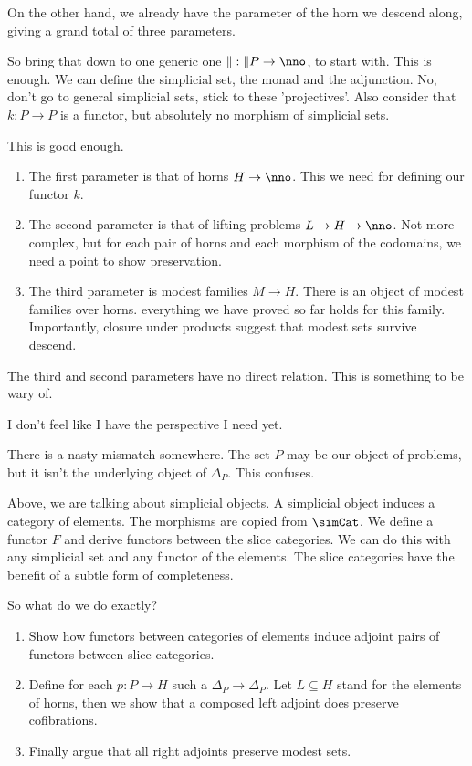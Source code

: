 \documentclass{tac}
\newcommand\of{:}
\newcommand\simplex\Delta
\newcommand\norm[1]{\Vert #1 \Vert}
\begin{document}
On the other hand, we already have the parameter of the horn we descend along, giving a grand total of three parameters.

So bring that down to one generic one $\norm:P\to \nno$, to start with.
This is enough. We can define the simplicial set, the monad and the adjunction.
No, don't go to general simplicial sets, stick to these 'projectives'.
Also consider that $k\of P\to P$ is a functor, but absolutely no morphism of simplicial sets.

This is good enough.
\begin{enumerate}
\item The first parameter is that of horns $H\to \nno$. This we need for defining our functor $k$.
\item The second parameter is that of lifting problems $L\to H\to \nno$. Not more complex, but for each pair of horns and each morphism of the codomains, we need a point to show preservation.
\item The third parameter is modest families $M\to H$. There is an object of modest families over horns. everything we have proved so far holds for this family. Importantly, closure under products suggest that modest sets survive descend.
\end{enumerate}
The third and second parameters have no direct relation. This is something to be wary of.

I don't feel like I have the perspective I need yet.

There is a nasty mismatch somewhere. The set $P$ may be our object of problems, but it isn't the underlying object of $\simplex_P$.
This confuses. 

Above, we are talking about simplicial objects. A simplicial object induces a category of elements. The morphisms are copied from $\simCat$. We define a functor $F$ and derive functors between the slice categories.
We can do this with any simplicial set and any functor of the elements. The slice categories have the benefit of a subtle form of completeness.

So what do we do exactly?
\begin{enumerate}
\item Show how functors between categories of elements induce adjoint pairs of functors between slice categories.
\item Define for each $p:P\to H$ such a $\simplex_P \to \simplex_P$. Let $L\subseteq H$ stand for the elements of horns, 
then we show that a composed left adjoint does preserve cofibrations.
\item Finally argue that all right adjoints preserve modest sets.
\end{enumerate}
\end{document}
